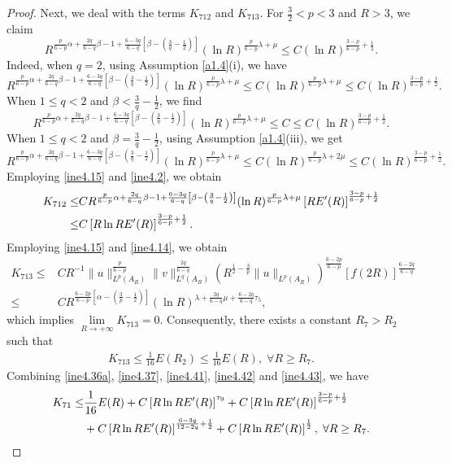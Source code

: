 \documentclass[11pt,reqno]{amsart}
\numberwithin{Thm}{section}
\begin{document}
\begin{proof}
Next, we deal with the terms $K_{712}$ and $K_{713}$. For $\frac{3}{2}<p<3$ and $R>3$, we claim
 $$
 R^{\frac{p}{6-p}\alpha+\frac{2q}{6-q}\beta-1+\frac{6-3q}{6-q}\left[\beta-\left(\frac{3}{q}-\frac{1}{2}\right)\right]}(\ln R)^{\frac{p}{6-p}\lambda+\mu}\leq C(\ln R)^{\frac{3-p}{6-p}+\frac{1}{2}}.
 $$
Indeed, when $q=2$, using Assumption \ref{a1.4}(i), we have
 $$
 R^{\frac{p}{6-p}\alpha+\frac{2q}{6-q}\beta-1+\frac{6-3q}{6-q}\left[\beta-\left(\frac{3}{q}-\frac{1}{2}\right)\right]}(\ln R)^{\frac{p}{6-p}\lambda+\mu}\leq C(\ln R)^{\frac{p}{6-p}\lambda+\mu}\leq C(\ln R)^{\frac{3-p}{6-p}+\frac{1}{2}}.
 $$
 When $1\leq q<2$ and $\beta<\frac{3}{q}-\frac{1}{2}$, we find
 $$
 R^{\frac{p}{6-p}\alpha+\frac{2q}{6-q}\beta-1+\frac{6-3q}{6-q}\left[\beta-\left(\frac{3}{q}-\frac{1}{2}\right)\right]}(\ln R)^{\frac{p}{6-p}\lambda+\mu}\leq C\leq C(\ln R)^{\frac{3-p}{6-p}+\frac{1}{2}}.
 $$
 When $1\leq q<2$ and $\beta=\frac{3}{q}-\frac{1}{2}$, using Assumption \ref{a1.4}(iii), we get
 $$
 R^{\frac{p}{6-p}\alpha+\frac{2q}{6-q}\beta-1+\frac{6-3q}{6-q}\left[\beta-\left(\frac{3}{q}-\frac{1}{2}\right)\right]}(\ln R)^{\frac{p}{6-p}\lambda+\mu}\leq C(\ln R)^{\frac{p}{6-p}\lambda+2\mu}\leq C(\ln R)^{\frac{3-p}{6-p}+\frac{1}{2}}.
 $$
Employing \eqref{ine4.15} and \eqref{ine4.2}, we obtain
\begin{align}\label{ine4.42}
	K_{712}\leq&C R^{\frac{p}{6-p}\alpha+\frac{2q}{6-q}\beta-1+\frac{6-3q}{6-q}\left[\beta-\left(\frac{3}{q}-\frac{1}{2}\right)\right]}(\ln R)^{\frac{p}{6-p}\lambda+\mu}\left[RE'(R)\right]^{\frac{3-p}{6-p}+\frac{1}{2}}\notag\\
  \leq&C\left[R\ln RE'(R)\right]^{\frac{3-p}{6-p}+\frac{1}{2}}.
\end{align}
Employing \eqref{ine4.15} and \eqref{ine4.14}, we obtain
\begin{align*}
K_{713} \leq&C R^{-1} \|u\|_{L^p(A_R)}^{\frac{p}{6-p}}\|v\|_{L^q(A_R)}^{\frac{2q}{6-q}}\left(R^{\frac{1}{2}-\frac{3}{p}} \|u\|_{L^p(A_R)}\right)^{\frac{6-2p}{6-p}}\left[f(2R)\right]^{\frac{6-2q}{6-q}}\\
\leq&CR^{\frac{6-2p}{6-p}\left[\alpha-\left(\frac{3}{p}-\frac{1}{2}\right)\right]}(\ln R)^{\lambda+\frac{2q}{6-q}\mu+\frac{6-2q}{6-q}\tau_5},
\end{align*}
which implies $\lim\limits_{R\rightarrow+\infty}K_{713}=0$.
Consequently, there exists a constant $R_7>R_2$ such that
\begin{align}\label{ine4.43}
K_{713}\leq\frac{1}{16}E(R_2)\leq \frac{1}{16}E(R),\;\forall R\geq R_7.
\end{align}
Combining \eqref{ine4.36a}, \eqref{ine4.37}, \eqref{ine4.41}, \eqref{ine4.42} and \eqref{ine4.43}, we have
\begin{align}\label{ine4.44}
K_{71}\leq&\frac{1}{16}E(R)+C\left[R\ln RE'(R)\right]^{\tau_9}+C\left[R\ln RE'(R)\right]^{\frac{3-p}{6-p}+\frac{1}{2}}\notag\\
&+C\left[R\ln RE'(R)\right]^{\frac{6-3q}{12-2q}+\frac{1}{2}}+C\left[R\ln R E'(R)\right]^{\frac{1}{2}},\;\forall R\geq R_7.
\end{align}




\end{proof}
\end{document}
